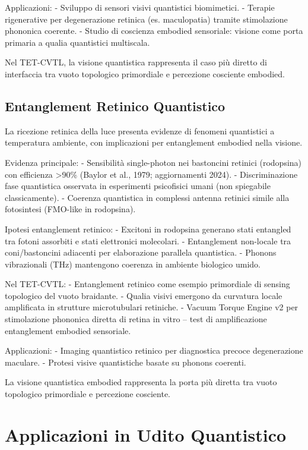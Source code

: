 \documentclass[11pt,a4paper]{article}
\begin{document}
Applicazioni:
- Sviluppo di sensori visivi quantistici biomimetici.
- Terapie rigenerative per degenerazione retinica (es. maculopatia) tramite stimolazione phononica coerente.
- Studio di coscienza embodied sensoriale: visione come porta primaria a qualia quantistici multiscala.

Nel TET-CVTL, la visione quantistica rappresenta il caso più diretto di interfaccia tra vuoto topologico primordiale e percezione cosciente embodied.

\subsection{Entanglement Retinico Quantistico}

La ricezione retinica della luce presenta evidenze di fenomeni quantistici a temperatura ambiente, con implicazioni per entanglement embodied nella visione.

Evidenza principale:
- Sensibilità single-photon nei bastoncini retinici (rodopsina) con efficienza >90\% (Baylor et al., 1979; aggiornamenti 2024).
- Discriminazione fase quantistica osservata in esperimenti psicofisici umani (non spiegabile classicamente).
- Coerenza quantistica in complessi antenna retinici simile alla fotosintesi (FMO-like in rodopsina).

Ipotesi entanglement retinico:
- Excitoni in rodopsina generano stati entangled tra fotoni assorbiti e stati elettronici molecolari.
- Entanglement non-locale tra coni/bastoncini adiacenti per elaborazione parallela quantistica.
- Phonons vibrazionali (THz) mantengono coerenza in ambiente biologico umido.

Nel TET-CVTL:
- Entanglement retinico come esempio primordiale di sensing topologico del vuoto braidante.
- Qualia visivi emergono da curvatura locale amplificata in strutture microtubulari retiniche.
- Vacuum Torque Engine v2 per stimolazione phononica diretta di retina in vitro – test di amplificazione entanglement embodied sensoriale.

Applicazioni:
- Imaging quantistico retinico per diagnostica precoce degenerazione maculare.
- Protesi visive quantistiche basate su phonons coerenti.

La visione quantistica embodied rappresenta la porta più diretta tra vuoto topologico primordiale e percezione cosciente.

\section{Applicazioni in Udito Quantistico}
\end{document}
